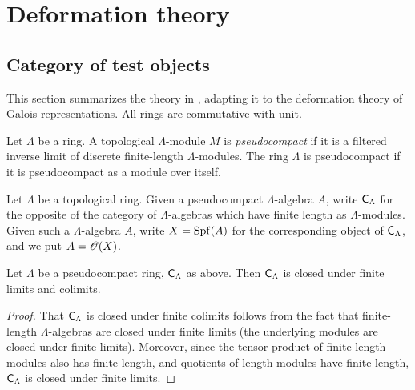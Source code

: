 




\chapter{Deformation theory}





\section{Category of test objects}

This section summarizes the theory in 
\cite[VII\textsubscript{B}, \S 0--1]{sga3-1}, adapting it to the deformation 
theory of Galois representations. All rings are commutative with unit. 

\begin{definition}
Let $\Lambda$ be a ring. A topological $\Lambda$-module $M$ is 
\emph{pseudocompact} if it is a filtered inverse limit of discrete 
finite-length $\Lambda$-modules. The ring $\Lambda$ is pseudocompact if it 
is pseudocompact as a module over itself. 
\end{definition}

Let $\Lambda$ be a topological ring. Given a pseudocompact $\Lambda$-algebra 
$A$, write $\mathsf{C}_\Lambda$ for the opposite 
of the category of $\Lambda$-algebras which have finite length as 
$\Lambda$-modules. Given such a $\Lambda$-algebra $A$, write $X=\operatorname{Spf}(A)$ for 
the corresponding object of $\mathsf{C}_\Lambda$, and we put $A=\mathscr{O}(X)$. 

\begin{lemma}
Let $\Lambda$ be a pseudocompact ring, $\mathsf{C}_\Lambda$ as above. Then 
$\mathsf{C}_\Lambda$ is closed under finite limits and colimits. 
\end{lemma}
\begin{proof}
That $\mathsf{C}_\Lambda$ is closed under finite colimits follows from the fact that 
finite-length $\Lambda$-algebras are closed under finite limits (the 
underlying modules are closed under finite limits). Moreover, since the tensor 
product of finite length modules also has finite length, and quotients of 
length modules have finite length, $\mathsf{C}_\Lambda$ is closed under finite 
limits. 
\end{proof}

